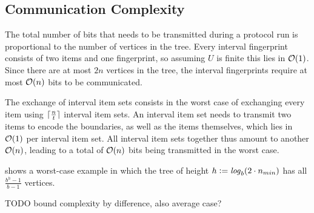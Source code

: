 \subsection{Communication Complexity}

The total number of bits that needs to be transmitted during a protocol run is proportional to the number of vertices in the tree. Every interval fingerprint consists of two items and one fingerprint, so assuming $U$ is finite this lies in $\mathcal{O}(1)$. Since there are at most $2n$ vertices in the tree, the interval fingerprints require at most $\mathcal{O}(n)$ bits to be communicated.

The exchange of interval item sets consists in the worst case of exchanging every item using $\lceil\frac{n}{t}\rceil$ interval item sets. An interval item set needs to transmit two items to encode the boundaries, as well as the items themselves, which lies in $\mathcal{O}(1)$ per interval item set. All interval item sets together thus amount to another $\mathcal{O}(n)$, leading to a total of $\mathcal{O}(n)$ bits being transmitted in the worst case.

 shows a worst-case example in which the tree of height $h \vcentcolon= \mathit{log}_{b}(2 \cdot n_{min})$ has all $\frac{b^{h} - 1}{b - 1}$ vertices. 

TODO bound complexity by difference, also average case?

